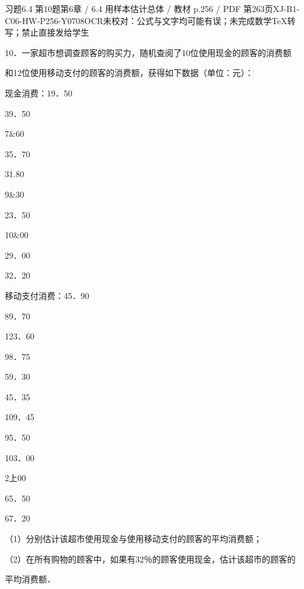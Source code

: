 \begin{bankitem}{习题6.4 第10题}{第6章 / 6.4 用样本估计总体 / 教材 p.256 / PDF 第263页}{XJ-B1-C06-HW-P256-Y0708}{OCR未校对：公式与文字均可能有误；未完成数学TeX转写；禁止直接发给学生}
\begin{ocrdraft}
\par
10．一家超市想调查顾客的购买力，随机查阅了10位使用现金的顾客的消费额
\par
和12位使用移动支付的顾客的消费额，获得如下数据（单位：元）：
\par
现金消费：19．50
\par
39．50
\par
7\&60
\par
35．70
\par
31.80
\par
9\&30
\par
23．50
\par
10\&00
\par
29．00
\par
32．20
\par
移动支付消费：45．90
\par
89．70
\par
123．60
\par
98．75
\par
59．30
\par
45．35
\par
109．45
\par
95．50
\par
103．00
\par
2上00
\par
65．50
\par
67．20
\par
（1）分别估计该超市使用现金与使用移动支付的顾客的平均消费额；
\par
（2）在所有购物的顾客中，如果有32％的顾客使用现金，估计该超市的顾客的
\par
平均消费额．
\end{ocrdraft}
\end{bankitem}
